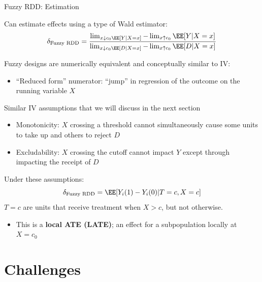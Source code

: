 \documentclass[compress, 8pt]{beamer}
\begin{document}
\begin{frame}{Fuzzy RDD: Estimation}

Can estimate effects using a type of Wald estimator:
\begin{equation*}
    \delta_{\text{Fuzzy RDD}}
    = \frac{
        \lim_{x \downarrow c_0 \EE [Y \vert X = x]} - \lim_{x \uparrow c_0} \EE [Y \vert X = x]
        }{
            \lim_{x \downarrow c_0 \EE [D \vert X = x]} - \lim_{x \uparrow c_0} \EE [D \vert X = x]
        }
\end{equation*}

Fuzzy designs are numerically equivalent and conceptually similar to IV:
\begin{itemize}
    \item ``Reduced form'' numerator: ``jump'' in regression of the outcome on the running variable $X$
\end{itemize}

Similar IV assumptions that we will discuss in the next section 
\begin{itemize}
    \item Monotonicity: $X$ crossing a threshold cannot simultaneously cause some units to take up and others to reject $D$
    \item Excludability: $X$ crossing the cutoff cannot impact $Y$ except through impacting the receipt of $D$
\end{itemize}
Under these assumptions:
\begin{equation*}
    \delta_{\text{Fuzzy RDD}} = \EE [Y_i (1) - Y_i (0) \vert T = c, X=c]
\end{equation*}
$T=c$ are units that receive treatment when $X > c$, but not otherwise. 
\begin{itemize}
    \item This is a \textbf{local ATE (LATE)}; an effect for a subpopulation locally at $X=c_0$
\end{itemize}

\end{frame}

\section[Challenges]{Challenges}
\miniframesoff
\begin{frame}
    \tableofcontents[currentsection]
\end{frame}
\miniframeson
\end{document}

